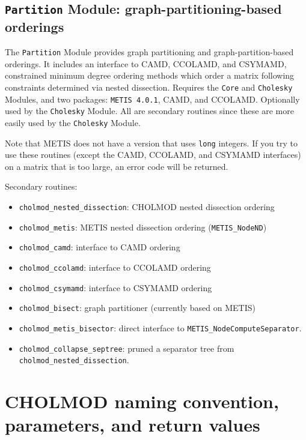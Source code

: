 \documentclass[11pt]{article}
\begin{document}
\subsection{{\tt Partition} Module: graph-partitioning-based orderings}

The {\tt Partition} Module provides
graph partitioning and graph-partition-based orderings.  It includes an
interface to CAMD, CCOLAMD, and CSYMAMD, constrained minimum degree ordering
methods which order a matrix following constraints determined via nested
dissection.
Requires the {\tt Core} and {\tt Cholesky} Modules, and two packages: {\tt METIS 4.0.1}, CAMD, and CCOLAMD.
Optionally used by the {\tt Cholesky} Module.  All are secondary routines since
these are more easily used by the {\tt Cholesky} Module.

Note that METIS does not have a version that uses {\tt long} integers.  If you try to use
these routines (except the CAMD, CCOLAMD, and CSYMAMD interfaces)
on a matrix that is too large, an error code will be returned.

\vspace{0.1in}
\noindent Secondary routines:
    \begin{itemize}
    \item {\tt cholmod\_nested\_dissection}: CHOLMOD nested dissection ordering
    \item {\tt cholmod\_metis}: METIS nested dissection ordering ({\tt METIS\_NodeND})
    \item {\tt cholmod\_camd}: interface to CAMD ordering
    \item {\tt cholmod\_ccolamd}: interface to CCOLAMD ordering
    \item {\tt cholmod\_csymamd}: interface to CSYMAMD ordering
    \item {\tt cholmod\_bisect}: graph partitioner (currently based on METIS)
    \item {\tt cholmod\_metis\_bisector}: direct interface to {\tt METIS\_NodeComputeSeparator}.
    \item {\tt cholmod\_collapse\_septree}: pruned a separator tree from
    {\tt cholmod\_nested\_dissection}.
    \end{itemize}

\newpage \section{CHOLMOD naming convention, parameters, and return values}
\end{document}
